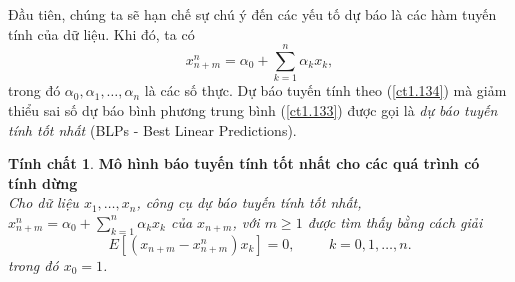 \documentclass[12pt, a4paper,oneside]{book}
\theoremstyle{definition}
\newtheorem{tc}[theo]{Tính chất}
\begin{document}
Đầu tiên, chúng ta sẽ hạn chế sự chú ý đến các yếu tố dự báo là các hàm tuyến tính của dữ liệu. Khi đó, ta có
\begin{equation}
x_{n+m}^n =\alpha_{0} + \sum_{k=1}^{n} \alpha_{k} x_{k}, \label{ct1.134}
\end{equation}
trong đó $\alpha_{0}, \alpha_{1},\dots, \alpha_{n} $ là các số thực. Dự báo tuyến tính theo (\ref{ct1.134}) mà giảm thiểu sai số dự báo bình phương trung bình (\ref{ct1.133}) được gọi là \textit{dự báo tuyến tính tốt nhất} (BLPs - Best Linear Predictions).
\begin{tc}\cite{8} \textbf{\label{BLP}Mô hình báo tuyến tính tốt nhất cho các quá trình có tính dừng}\\
	\textit{Cho dữ liệu $x_{1}, \dots, x_{n}$, công cụ dự báo tuyến tính tốt nhất, $x_{n+m}^n= \alpha_{0} + \sum_{k=1}^{n}\alpha_{k} x_{k}$ của $x_{n+m}$, với $m\geq1$ được tìm thấy bằng cách giải
		\begin{equation}
		E[(x_{n+m} - x_{n+m}^n)x_{k}] = 0, \hspace{1cm} k=0, 1, \dots, n. \label{ct1.135}
		\end{equation}
		trong đó $x_{0}=1$.}
\end{tc}
\end{document}
